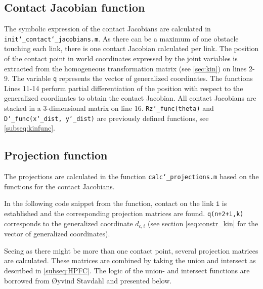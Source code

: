 \subsection{Contact Jacobian function}
The symbolic expression of the contact Jacobians are calculated in\\ \texttt{init\char`_contact\char`_jacobians.m}. As there can be a maximum of one obstacle touching each link, there is one contact Jacobian calculated per link. The position of the contact point in world coordinates expressed by the joint variables is extracted from the homogeneous transformation matrix (see \ref{sec:kin}) on lines 2-9. The variable \texttt{q} represents the vector of generalized coordinates. The functions  Lines 11-14 perform partial differentiation of the position with respect to the generalized coordinates to obtain the contact Jacobian. All contact Jacobians are stacked in a 3-dimensional matrix on line 16. \texttt{Rz\char`_func(theta)} and \texttt{D\char`_func(x\char`_dist, y\char`_dist)} are previously defined functions, see \ref{subseq:kinfunc}.




\subsection{Projection function}

The projections are calculated in the function \texttt{calc\char`_projections.m} based on the functions for the contact Jacobians. 

In the following code snippet from the function, contact on the link \texttt{i} is established and the corresponding projection matrices are found. \texttt{q(n+2+i,k)} corresponds to the generalized coordinate $d_{c,i}$ (see section \ref{seq:constr_kin} for the vector of generalized coordinates).



Seeing as there might be more than one contact point, several projection matrices are calculated. These matrices are combined by taking the union and intersect as described in \ref{subseq:HPFC}. The logic of the union- and intersect functions are borrowed from Øyvind Stavdahl and presented below.

